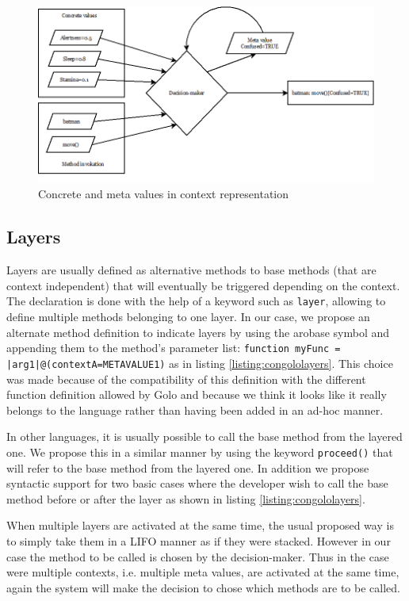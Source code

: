 \documentclass[a4paper]{article}
\begin{document}
\begin{center}
\begin{figure}
\centering
\includegraphics[width=0.9\columnwidth]{images/concrete-meta-values.png}
\caption{Concrete and meta values in context representation}
\label{figure:concretemetavalues}
\end{figure}
\end{center}

\subsection{Layers}
\label{subsection:layers}
Layers are usually defined as alternative methods to base methods (that are context independent) that will eventually be triggered depending on the context. The declaration is done with the help of a keyword such as \lstinline|layer|, allowing to define multiple methods belonging to one layer. In our case, we propose an alternate method definition to indicate layers by using the arobase symbol and appending them to the method's parameter list: \lstinline!function myFunc = |arg1|@(contextA=METAVALUE1)! as in listing \ref{listing:congololayers}. This choice was made because of the compatibility of this definition with the different function definition allowed by Golo and because we think it looks like it really belongs to the language rather than having been added in an ad-hoc manner.

In other languages, it is usually possible to call the base method from the layered one. We propose this in a similar manner by using the keyword \lstinline|proceed()| that will refer to the base method from the layered one. In addition we propose syntactic support for two basic cases where the developer wish to call the base method before or after the layer as shown in listing \ref{listing:congololayers}.

When multiple layers are activated at the same time, the usual proposed way is to simply take them in a LIFO manner as if they were stacked. However in our case the method to be called is chosen by the decision-maker. Thus in the case were multiple contexts, i.e. multiple meta values, are activated at the same time, again the system will make the decision to chose which methods are to be called.
\end{document}

